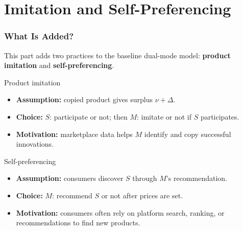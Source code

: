 \section{Imitation and Self-Preferencing}

\begin{frame}
  \frametitle{What Is Added?}
  \footnotesize
  This part adds two practices to the baseline dual-mode model: \textbf{product imitation} and \textbf{self-preferencing}.

  \begin{block}{Product imitation}
    \begin{itemize}
      \item \textbf{Assumption:} copied product gives surplus $\nu+\Delta$.
      \item \textbf{Choice:} $S$: participate or not; then $M$: imitate or not
        if $S$ participates.
      \item \textbf{Motivation:} marketplace data helps $M$ identify and copy
        successful innovations.
    \end{itemize}
  \end{block}

  \begin{block}{Self-preferencing}
    \begin{itemize}
      \item \textbf{Assumption:} consumers discover $S$ through $M$'s recommendation.
      \item \textbf{Choice:} $M$: recommend $S$ or not after prices are set.
      \item \textbf{Motivation:} consumers often rely on platform search, ranking,
        or recommendations to find new products.
    \end{itemize}
  \end{block}

\end{frame}


